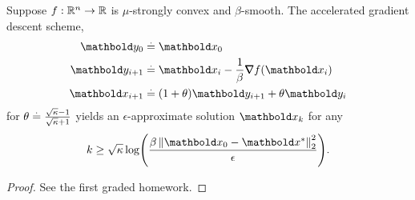 \begin{thm} Suppose $f: \mathbb{R}^n \to \mathbb{R}$ is $\mu$-strongly convex and $\beta$-smooth. The accelerated gradient descent scheme, \begin{align}\begin{split}
    \vy_0 &\defeq \vx_0 \\
    \vy_{i+1} &\defeq \vx_i - \frac{1}{\beta} \grad f(\vx_i) \\
    \vx_{i+1} &\defeq (1+\theta)\vy_{i+1} + \theta\vy_i
\end{split}\end{align} for $\theta \overset{.}{=} \frac{\sqrt{\kappa} - 1}{\sqrt{\kappa} + 1}$ yields an $\epsilon$-approximate solution $\vx_k$ for any \begin{align*}
    k \geq \sqrt{\kappa}\log\parentheses*{\frac{\beta\norm{\vx_0 - \s{\vx}}_2^2}{\epsilon}}.
\end{align*}
\end{thm}
\begin{proof}
See the first graded homework.
\end{proof}
